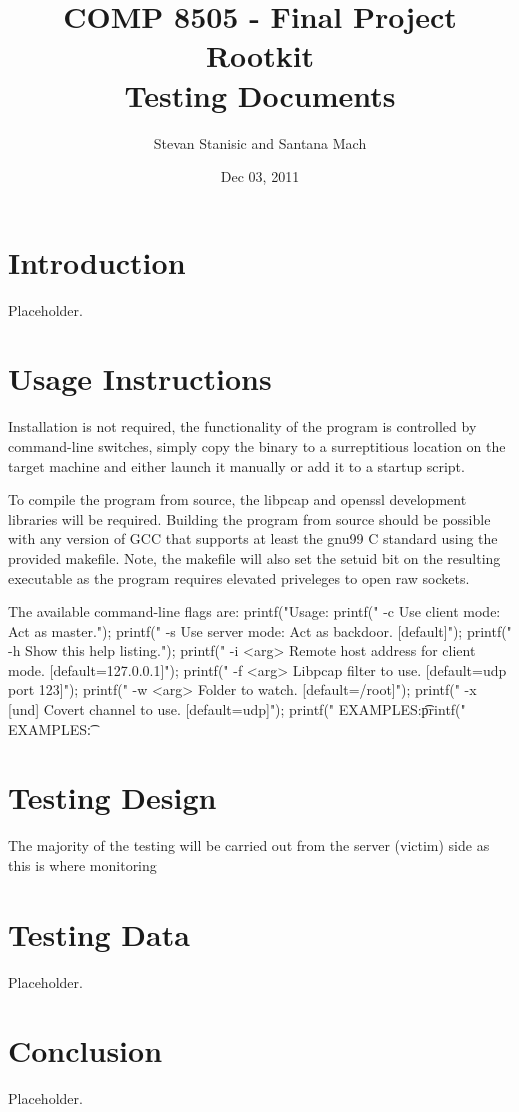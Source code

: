 \documentclass[titlepage]{article}
\begin{document}
\author{Stevan Stanisic and Santana Mach}
\title{COMP 8505 - Final Project \\ Rootkit \\ Testing Documents}
\date{Dec 03, 2011}
\maketitle{}

\tableofcontents
\pagebreak

\section{Introduction}

Placeholder.

\section{Usage Instructions}

Installation is not required, the functionality of the program is controlled by command-line switches, simply copy the binary to a surreptitious location on the target machine and either launch it manually or add it to a startup script.

To compile the program from source, the libpcap and openssl development libraries will be required.  Building the program from source should be possible with any version of GCC that supports at least the gnu99 C standard using the provided makefile.  Note, the makefile will also set the setuid bit on the resulting executable as the program requires elevated priveleges to open raw sockets.

The available command-line flags are:
	printf("Usage: %
	printf(" -c Use client mode: Act as master.\n");
	printf(" -s Use server mode: Act as backdoor. [default]\n");
	printf(" -h Show this help listing.\n");
	printf(" -i <arg> Remote host address for client mode. [default=127.0.0.1]\n");
	printf(" -f <arg> Libpcap filter to use. [default=udp port 123]\n");
	printf(" -w <arg> Folder to watch. [default=/root]\n");
	printf(" -x [und] Covert channel to use. [default=udp]\n");
	printf(" EXAMPLES:\t %
	printf(" EXAMPLES:\t %

\section{Testing Design}

The majority of the testing will be carried out from the server (victim) side as this is where monitoring

\section{Testing Data}

Placeholder.

\section{Conclusion}

Placeholder.
\end{document}
